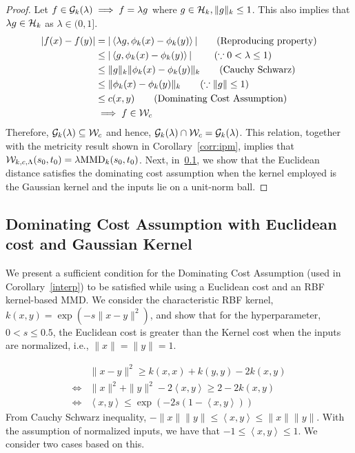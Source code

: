 \begin{proof}
Let $f\in \mathcal{G}_k(\lambda)\implies f=\lambda g$ where $g\in \mathcal{H}_k, \|g\|_k\leq 1$. This also implies that $\lambda g\in \mathcal{H}_k$ as $\lambda\in(0,1]$.
\begin{align*}
    |f(x)-f(y)| &= |\left<\lambda g, \phi_k(x)-\phi_k(y) \right>| \tag{Reproducing property}\\
    &\leq |\left<g, \phi_k(x)-\phi_k(y) \right>| \ \tag{$\because 0<\lambda \leq 1$}\\
    &\leq \|g\|_k \|\phi_k(x)-\phi_k(y)\|_k \tag{Cauchy Schwarz}\\
    & \leq \|\phi_k(x)-\phi_k(y)\|_k \tag{$\because \|g\|\leq 1$}\\
    & \leq c(x, y) \tag{Dominating Cost Assumption}\\
    & \implies f\in \calW_c
\end{align*}
Therefore, $\mathcal{G}_k(\lambda)\subseteq \mathcal{W}_c$ and hence, $\mathcal{G}_k(\lambda)\cap \mathcal{W}_c = \mathcal{G}_k(\lambda)$. This relation, together with the metricity result shown in Corollary~\ref{corr:ipm}, implies that $\mathcal{W}_{k, c, \Lambda}(s_0, t_0)=\lambda \textup{MMD}_k(s_0, t_0)$. Next, in~\ref{dominating}, we show that the Euclidean distance satisfies the dominating cost assumption when the kernel employed is the Gaussian kernel and the inputs lie on a unit-norm ball.
\end{proof}
\subsection[Substantiating the Assumption on Cost Function to Recover MMD from MMD-OT]{Dominating Cost Assumption with Euclidean cost and Gaussian Kernel}\label{dominating} 
We present a sufficient condition for the Dominating Cost Assumption (used in Corollary~\ref{interp}) to be satisfied while using a Euclidean cost and an RBF kernel-based MMD.
We consider the characteristic RBF kernel, $k(x, y)=\exp{(-s\|x-y\|^2)}$, and show that for the hyperparameter, $0<s \leq 0.5$, the Euclidean cost is greater than the Kernel cost when the inputs are normalized, i.e., $\|x\|=\|y\|=1$.

\begin{align}\label{ineq}
    &\|x-y\|^2 \geq k(x, x) + k(y, y) - 2k(x, y) \\
    \iff &\|x\|^2 + \|y\|^2 - 2\left<x, y\right> \geq 2-2k(x, y) \nonumber\\
    \iff &\left<x, y\right> \leq \exp{\left(-2s(1-\left<x, y\right>)\right)} \tag{Assuming normalized inputs}
\end{align}
From Cauchy Schwarz inequality, $-\|x\|\|y\|\leq \left<x, y\right> \leq \|x\|\|y\|$. With the assumption of normalized inputs, we have that $-1\leq \left<x, y\right> \leq 1$. We consider two cases based on this.
